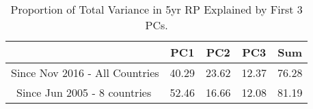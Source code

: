 \begin{table}
	\centering
\begin{tabular}{l|cccc}
\toprule
&\textbf{PC1}&\textbf{PC2}&\textbf{PC3}&\textbf{Sum}\\\midrule
{ Since Nov 2016} - All Countries&40.29&23.62&12.37&76.28\\\
Since Jun 2005 - 8 countries&52.46&16.66&12.08&81.19\\ \bottomrule
\end{tabular}
\\
\caption{Proportion of Total Variance in 5yr RP Explained by First 3 PCs.}
\label{tab:pc_common}
\end{table}
